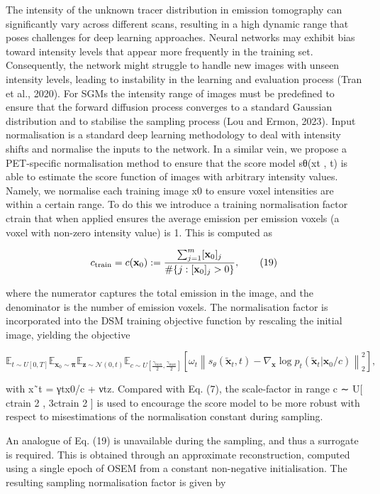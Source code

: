 \documentclass{article}
\begin{document}
The intensity of the unknown tracer distribution in emission tomography can significantly vary across different scans, resulting in a high dynamic range that poses challenges for deep learning approaches. Neural networks may exhibit bias toward intensity levels that appear more frequently in the training set. Consequently, the network might struggle to handle new images with unseen intensity levels, leading to instability in the learning and evaluation process (Tran et al., 2020). For SGMs the intensity range of images must be predefined to ensure that the forward diffusion process converges to a standard Gaussian distribution and to stabilise the sampling process (Lou and Ermon, 2023). Input normalisation is a standard deep learning methodology to deal with intensity shifts and normalise the inputs to the network. In a similar vein, we propose a PET-specific normalisation method to ensure that the score model sθ(xt , t) is able to estimate the score function of images with arbitrary intensity values. Namely, we normalise each training image x0 to ensure voxel intensities are within a certain range. To do this we introduce a training normalisation factor ctrain that when applied ensures the average emission per emission voxels (a voxel with non-zero intensity value) is 1. This is computed as

$$c_{\rm train}=c({\bf x}_{0}):=\frac{\sum_{j=1}^{m}[{\bf x}_{0}]_{j}}{\#\{j:[{\bf x}_{0}]_{j}>0\}},\tag{19}$$

where the numerator captures the total emission in the image, and the denominator is the number of emission voxels. The normalisation factor is incorporated into the DSM training objective function by rescaling the initial image, yielding the objective

$$\mathbb{E}_{t\sim U[0,T]}\mathbb{E}_{\mathbf{x}_{0}\sim\mathbf{\pi}}\mathbb{E}_{\mathbf{z}\sim\mathcal{N}(0,t)}\mathbb{E}_{c\sim U[\frac{\gamma_{\text{max}}}{2},\frac{\gamma_{\text{max}}}{2}]}\left[\omega_{t}\left\|s_{\theta}\left(\tilde{\mathbf{x}}_{t},t\right)-\nabla_{\mathbf{x}}\log p_{t}(\tilde{\mathbf{x}}_{t}|\mathbf{x}_{0}/c)\right\|_{2}^{2}\right],\tag{20}$$

with x˜t = γtx0/c + νtz. Compared with Eq. (7), the scale-factor in range c ∼ U[ ctrain 2 , 3ctrain 2 ] is used to encourage the score model to be more robust with respect to misestimations of the normalisation constant during sampling.

An analogue of Eq. (19) is unavailable during the sampling, and thus a surrogate is required. This is obtained through an approximate reconstruction, computed using a single epoch of OSEM from a constant non-negative initialisation. The resulting sampling normalisation factor is given by
\end{document}
